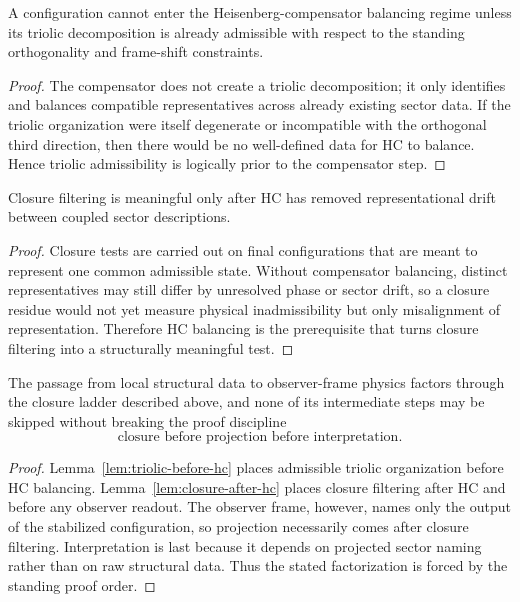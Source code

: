 \begin{lemma}
\label{lem:triolic-before-hc}
A configuration cannot enter the Heisenberg-compensator balancing regime unless
its triolic decomposition is already admissible with respect to the standing
orthogonality and frame-shift constraints.
\end{lemma}

\begin{proof}
The compensator does not create a triolic decomposition; it only identifies and
balances compatible representatives across already existing sector data. If the
triolic organization were itself degenerate or incompatible with the orthogonal
third direction, then there would be no well-defined data for HC to balance.
Hence triolic admissibility is logically prior to the compensator step.
\end{proof}

\begin{lemma}
\label{lem:closure-after-hc}
Closure filtering is meaningful only after HC has removed representational drift
between coupled sector descriptions.
\end{lemma}

\begin{proof}
Closure tests are carried out on final configurations that are meant to
represent one common admissible state. Without compensator balancing, distinct
representatives may still differ by unresolved phase or sector drift, so a
closure residue would not yet measure physical inadmissibility but only
misalignment of representation. Therefore HC balancing is the prerequisite that
turns closure filtering into a structurally meaningful test.
\end{proof}

\begin{proposition}
\label{prop:closure-ladder}
The passage from local structural data to observer-frame physics factors through
the closure ladder described above, and none of its intermediate steps may be
skipped without breaking the proof discipline
\[
\text{closure before projection before interpretation}.
\]
\end{proposition}

\begin{proof}
Lemma~\ref{lem:triolic-before-hc} places admissible triolic organization before
HC balancing. Lemma~\ref{lem:closure-after-hc} places closure filtering after
HC and before any observer readout. The observer frame, however, names only the
output of the stabilized configuration, so projection necessarily comes after
closure filtering. Interpretation is last because it depends on projected
sector naming rather than on raw structural data. Thus the stated factorization
is forced by the standing proof order.
\end{proof}

